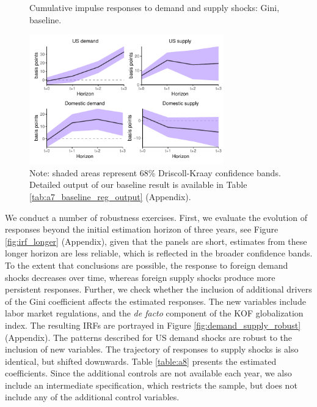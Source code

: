 \documentclass[12pt, a4paper]{article}
\begin{document}
\begin{figure}[H]
    \centering    
    \caption{Cumulative impulse responses to demand and supply shocks: Gini, baseline.}  
    \label{fig:demand_supply_base}
    \includegraphics[width=0.75\textwidth]{Figures/baseline_demand_supply_LP_extended.pdf}
    \centering \caption*{Note: shaded areas represent 68\% Driscoll-Kraay confidence bands. Detailed output of our baseline result is available in Table \ref{tab:a7_baseline_reg_output} (Appendix).}
\end{figure}

We conduct a number of robustness exercises. First, we evaluate the evolution of responses beyond the initial estimation horizon of three years, see Figure \ref{fig:irf_longer} (Appendix), given that the panels are short, estimates from these longer horizon are less reliable, which is reflected in the broader confidence bands. To the extent that conclusions are possible, the response to foreign demand shocks decreases over time, whereas foreign supply shocks produce more persistent responses. Further, we check whether the inclusion of additional drivers of the Gini coefficient affects the estimated responses. The new variables include labor market regulations, and the \textit{de facto} component of the KOF globalization index. The resulting IRFs are portrayed in Figure \ref{fig:demand_supply_robust} (Appendix). The patterns described for US demand shocks are robust to the inclusion of new variables. The trajectory of responses to supply shocks is also identical, but shifted downwards. Table \ref{table:a8} presents the estimated coefficients. Since the additional controls are not available each year, we also include  an intermediate specification, which restricts the sample, but does not include any of the additional control variables.
\end{document}
